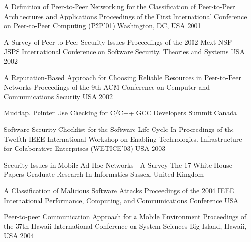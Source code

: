 \begin{thebibliography}{9}
		{}
		{A Definition of Peer-to-Peer Networking for the Classification of Peer-to-Peer Architectures and Applications}
		{Proceedings of the First International Conference on Peer-to-Peer Computing ({P2P}'01)}
		{Washington, DC, USA}
		{2001}

		{}
		{A Survey of Peer-to-Peer Security Issues}
		{Proceedings of the 2002 {M}ext-{NSF}-{JSPS} International Conference on Software Security. Theories and Systems}
		{USA}
		{2002}
	
		{
			\BibAnd
			\BibAnd
			\BibAnd
			\BibAnd
			}
		{A Reputation-Based Approach for Choosing Reliable Resources in Peer-to-Peer Networks}
		{Proceedings of the 9th ACM Conference on Computer and Communications Security}
		{USA}
		{2002}
		
		{}
		{Mudflap. Pointer Use Checking for {C/C++}}
		{{GCC} Developers Summit}
		{Canada}
		{}
	
		{
			\BibAnd
			\BibAnd
			}
		{Software Security Checklist for the Software Life Cycle}
		{In Proceedings of the Twelfth {IEEE} International Workshop on Enabling Technologies. Infrastructure for Colaborative Enterprises ({WETICE}'03)}
		{USA}
		{2003}
	
		{
			\BibAnd
			}
		{Security Issues in Mobile Ad Hoc Networks - A Survey}
		{The 17 White House Papers Graduate Research In Informatics}
		{Sussex, United Kingdom}
		{}
	
		{
			\BibAnd
			}
		{A Classification of Malicious Software Attacks}
		{Proceedings of the 2004 IEEE International Performance, Computing, and Communications Conference}
		{USA}
		{}
	
		{
			\BibAnd
			\BibAnd
			}
		{Peer-to-peer Communication Approach for a Mobile Environment}
		{Proceedings of the 37th {H}awaii International Conference on System Sciences}
		{Big Island, Hawaii, USA}
		{2004}
	

\end{thebibliography}
